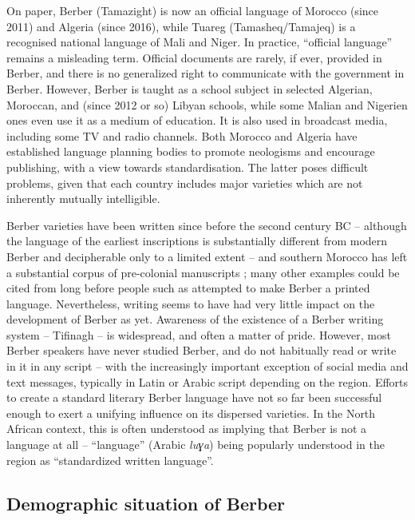 \documentclass[output=paper]{langsci/langscibook}
\begin{document}
On paper, Berber (Tamazight) is now an official language of Morocco (since 2011) and Algeria (since 2016), while Tuareg (Tamasheq/Tamajeq) is a recognised national language of Mali and Niger. In practice, “official language” remains a misleading term.  Official documents are rarely, if ever, provided in Berber, and there is no generalized right to communicate with the government in Berber.  However, Berber is taught as a school subject in selected Algerian, Moroccan, and (since 2012 or so) Libyan schools, while some Malian and Nigerien ones even use it as a medium of education. It is also used in broadcast media, including some TV and radio channels. Both Morocco and Algeria have established language planning bodies to promote neologisms and encourage publishing, with a view towards standardisation. The latter poses difficult problems, given that each country includes major varieties which are not inherently mutually intelligible.

Berber varieties have been written since before the second century BC \citep{Pichler2007} – although the language of the earliest inscriptions is substantially different from modern Berber and decipherable only to a limited extent – and southern Morocco has left a substantial corpus of pre-colonial manuscripts \citep{Boogert1997}; many other examples could be cited from long before people such as \citet{Mammeri1976} attempted to make Berber a printed language. Nevertheless, writing seems to have had very little impact on the development of Berber as yet. Awareness of the existence of a Berber writing system – Tifinagh – is widespread, and often a matter of pride. However, most Berber speakers have never studied Berber, and do not habitually read or write in it in any script – with the increasingly important exception of social media and text messages, typically in Latin or Arabic script depending on the region. Efforts to create a standard literary Berber language have not so far been successful enough to exert a unifying influence on its dispersed varieties. In the North African context, this is often understood as implying that Berber is not a language at all – “language” (Arabic \textit{luɣa}) being popularly understood in the region as “standardized written language”.


 
 \subsection{Demographic situation of Berber}
\end{document}

